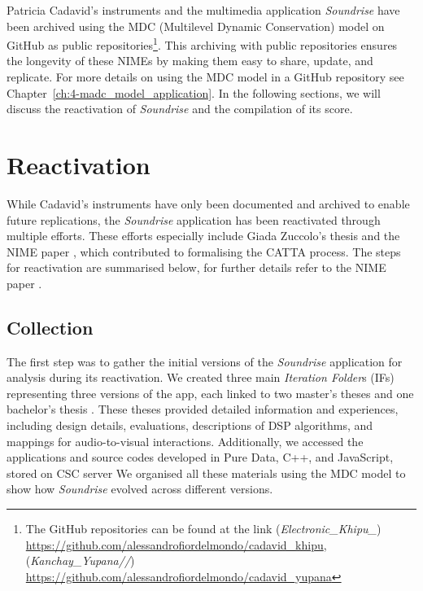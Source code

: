 Patricia Cadavid’s instruments and the multimedia application \textit{Soundrise} have been archived using the MDC (Multilevel Dynamic Conservation) model on GitHub as public repositories\footnote{The GitHub repositories can be found at the link (\textit{Electronic\_Khipu\_}) \url{https://github.com/alessandrofiordelmondo/cadavid_khipu}, (\textit{Kanchay\_Yupana//}) \url{https://github.com/alessandrofiordelmondo/cadavid_yupana}}. This archiving with public repositories ensures the longevity of these NIMEs by making them easy to share, update, and replicate. For more details on using the MDC model in a GitHub repository see Chapter~\ref{ch:4-madc_model_application}. In the following sections, we will discuss the reactivation of \textit{Soundrise} and the compilation of its score.

\section{Reactivation}
While Cadavid's instruments have only been documented and archived to enable future replications, the \textit{Soundrise} application has been reactivated through multiple efforts. These efforts especially include Giada Zuccolo's thesis \cite{zuccolo2023soundrise} and the NIME paper \cite{fiordelmondo2024nime}, which contributed to formalising the CATTA process. The steps for reactivation are summarised below, for further details refer to the NIME paper \cite{fiordelmondo2024nime}.\\

\subsection*{Collection}
The first step was to gather the initial versions of the \textit{Soundrise} application for analysis during its reactivation. We created three main \textit{Iteration Folder}s (IFs) representing three versions of the app, each linked to two master’s theses \cite{randon2012soundrise, giusto2012soundrise} and one bachelor’s thesis \cite{turetta2023soundrise}. These theses provided detailed information and experiences, including design details, evaluations, descriptions of DSP algorithms, and mappings for audio-to-visual interactions. Additionally, we accessed the applications and source codes developed in Pure Data, C++, and JavaScript, stored on CSC server We organised all these materials using the MDC model to show how \textit{Soundrise} evolved across different versions.

